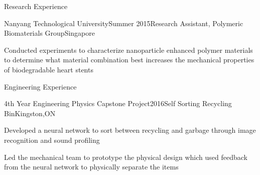 \documentclass{resume2} %
\begin{document}
\begin{rSection}{Research Experience}
	\begin{rSubsection}{Nanyang Technological University}{Summer 2015}{Research Assistant, Polymeric Biomaterials Group}{Singapore}
	\item Conducted experiments to characterize nanoparticle enhanced polymer materials to determine what material combination best increases the mechanical properties of biodegradable heart stents  
	\end{rSubsection}

\end{rSection}
\pagebreak

\begin{rSection}{Engineering Experience}
	
	\begin{rSubsection}{4th Year Engineering Physics Capstone Project}{2016}{Self Sorting Recycling Bin}{Kingston,ON}
		\item Developed a neural network to sort between recycling and garbage through image recognition and sound profiling
		\item Led the mechanical team to prototype the physical design which used feedback from the neural network to physically separate the items 
	\end{rSubsection}
\iffalse
	\begin{rSubsection}{Engineering Physics Design Project}{2015}{Photodiode Research Sensor}{}
		\item Designed and fabricated a research sensor used to assess the properties of photodiodes. Information gathered included efficiency, current and voltage under illuminated and darkened conditions using an Arduino, Matlab and LabVIEW
	\end{rSubsection}

	\begin{rSubsection}{Engineering Design and Practice II}{2014}{Nuclear Waste Gamma Radiation Detector}{Kingston,ON}
		\item Prototyped a Nuclear Waste Gamma Radiation Detector. Through the process of material selection and decision making, the final product was designed for use in areas surrounding the Deep Geologic Repository in Ontario
	\end{rSubsection}

	\begin{rSubsection}{Wirecard AG}{Summer 2014}{Summer Technology Intern}{Singapore}
	\item Redesigned Wirecard's payment processing webpage using HTML and CSS
	\item It is currently used for redirecting online payments to Wirecard's payment processing service	
	\end{rSubsection}
\fi
\end{rSection}
\end{document}
